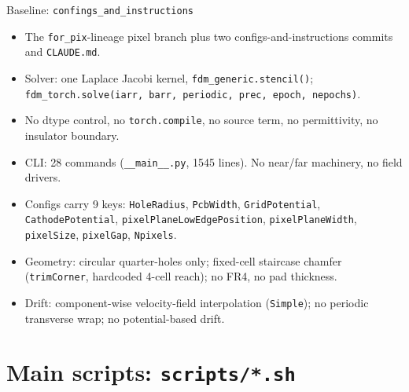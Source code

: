 \documentclass[10pt,aspectratio=169]{beamer}
\newcommand{\ti}[1]{\texttt{\footnotesize #1}}
\begin{document}
\begin{frame}[allowframebreaks]{Baseline: \texttt{confings\_and\_instructions}}
  \begin{itemize}\small
  \item The \ti{for\_pix}-lineage pixel branch plus two configs-and-instructions commits
        and \ti{CLAUDE.md}.
  \item Solver: one Laplace Jacobi kernel, \ti{fdm\_generic.stencil()}; \\
        \ti{fdm\_torch.solve(iarr, barr, periodic, prec, epoch, nepochs)}.
  \item No dtype control, no \ti{torch.compile}, no source term, no permittivity,
        no insulator boundary.
  \item CLI: 28 commands (\ti{\_\_main\_\_.py}, 1545 lines). No near/far machinery,
        no field drivers.
  \item Configs carry 9 keys: \ti{HoleRadius}, \ti{PcbWidth}, \ti{GridPotential},
        \ti{CathodePotential}, \ti{pixelPlaneLowEdgePosition}, \ti{pixelPlaneWidth},
        \ti{pixelSize}, \ti{pixelGap}, \ti{Npixels}.
  \item Geometry: circular quarter-holes only; fixed-cell staircase chamfer
        (\ti{trimCorner}, hardcoded 4-cell reach); no FR4, no pad thickness.
  \item Drift: component-wise velocity-field interpolation (\ti{Simple}); no periodic
        transverse wrap; no potential-based drift.
  \end{itemize}
\end{frame}

\section{Main scripts: \texttt{scripts/*.sh}}
\end{document}
